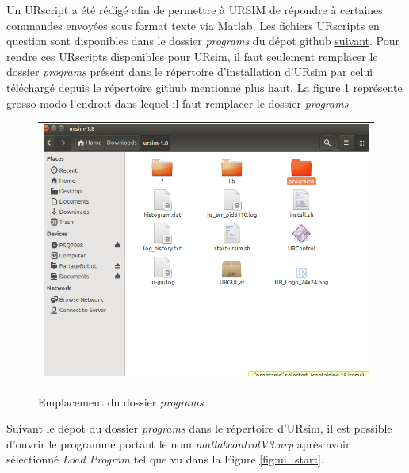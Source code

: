 \documentclass[root.tex]{subfiles}
\begin{document}
Un URscript a été rédigé afin de permettre à URSIM de répondre à certaines commandes envoyées sous format texte via Matlab.
Les fichiers URscripts en question sont disponibles dans le dossier \textit{programs} du dépot github \href{https://github.com/wonwon0/code_sujet_special}{suivant}.
Pour rendre ces URscripts disponibles pour URsim, il faut seulement remplacer le dossier \textit{programs} présent dans le répertoire d'installation d'URsim par celui téléchargé depuis le répertoire github mentionné plus haut. La figure \ref{fig:programs} représente grosso modo l'endroit dans lequel il faut remplacer le dossier \textit{programs}.
\begin{figure}
 \begin{center}
  \begin{tabular}{c}
    \includegraphics[trim=0cm 0cm 0cm 0cm, scale=0.5]{screenshots_tuto_ursim/programs.png}
  \end{tabular}
 \end{center}
\caption{Emplacement du dossier \textit{programs}}
 \label{fig:programs}
\end{figure}
Suivant le dépot du dossier \textit{programs} dans le répertoire d'URsim, il est possible d'ouvrir le programme portant le nom
\textit{matlabcontrolV3.urp} après avoir sélectionné \textit{Load Program} tel que vu dans la Figure \ref{fig:ui_start}.
\end{document}
